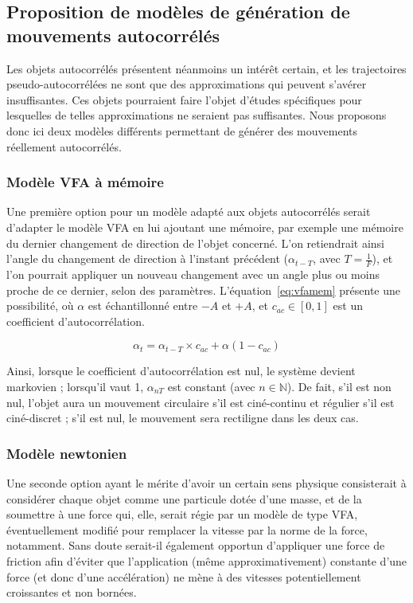     \subsection{Proposition de modèles de génération de mouvements autocorrélés}
    Les objets autocorrélés présentent néanmoins un intérêt certain, et les trajectoires pseudo-autocorrélées ne sont que des approximations qui peuvent s'avérer insuffisantes. Ces objets pourraient faire l'objet d'études spécifiques pour lesquelles de telles approximations ne seraient pas suffisantes. Nous proposons donc ici deux modèles différents permettant de générer des mouvements réellement autocorrélés.
    
    \subsubsection{Modèle VFA à mémoire}
    Une première option pour un modèle adapté aux objets autocorrélés serait d'adapter le modèle VFA en lui ajoutant une mémoire, par exemple une mémoire du dernier changement de direction de l'objet concerné. L'on retiendrait ainsi l'angle du changement de direction à l'instant précédent ($\alpha_{t-T}$, avec $T = \frac{1}{F}$), et l'on pourrait appliquer un nouveau changement avec un angle plus ou moins proche de ce dernier, selon des paramètres. L'équation~\ref{eq:vfamem} présente une possibilité, où $\alpha$ est échantillonné entre $-A$ et $+A$, et $c_{ac} \in [0,1]$ est un coefficient d'autocorrélation.
    
    \begin{equation}
		\alpha_{t} = \alpha_{t-T} \times c_{ac} + \alpha (1 - c_{ac})
		\label{eq:vfamem}
    \end{equation}
    
	Ainsi, lorsque le coefficient d'autocorrélation est nul, le système devient markovien ; lorsqu'il vaut 1, $\alpha_{nT}$ est constant (avec $n \in \mathbb{N}$). De fait, s'il est non nul, l'objet aura un mouvement circulaire s'il est ciné-continu et régulier s'il est ciné-discret ; s'il est nul, le mouvement sera rectiligne dans les deux cas.
    
    \subsubsection{Modèle newtonien}
    Une seconde option ayant le mérite d'avoir un certain sens physique consisterait à considérer chaque objet comme une particule dotée d'une masse, et de la soumettre à une force qui, elle, serait régie par un modèle de type VFA, éventuellement modifié pour remplacer la vitesse par la norme de la force, notamment. Sans doute serait-il également opportun d'appliquer une force de friction afin d'éviter que l'application (même approximativement) constante d'une force (et donc d'une accélération\footnotemark{}) ne mène à des vitesses potentiellement croissantes et non bornées.
    

